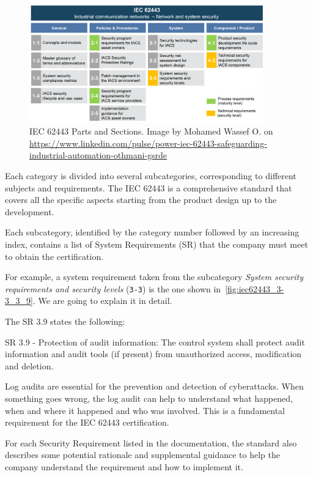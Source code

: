 \begin{figure}[ht]
  \centering
  \includegraphics[width=0.9\textwidth]{chapters/04/assets/iec62443.png}
  \caption[IEC 62443 Parts and Sections. Image by Mohamed Wassef O.]{IEC 62443 Parts and Sections. Image by Mohamed Wassef O. on \url{https://www.linkedin.com/pulse/power-iec-62443-safeguarding-industrial-automation-othmani-gsrde}}
  \label{fig:iec-62443}
\end{figure}

Each category is divided into several subcategories, corresponding to different subjects and requirements. The IEC 62443 is a comprehensive standard that covers all the specific aspects starting from the product design up to the development.

Each subcategory, identified by the category number followed by an increasing index, contains a list of System Requirements (SR) that the company must meet to obtain the certification.

For example, a system requirement taken from the subcategory \textit{System security requirements and security levels} (\texttt{3-3}) is the one shown in~\cref{fig:iec62443_3-3_3_9}. We are going to explain it in detail.

The SR 3.9 states the following:
\begin{mdframed}
  SR 3.9 - Protection of audit information: The control system shall protect audit information and audit tools (if present) from unauthorized access, modification and deletion.
\end{mdframed}\label{sr:3-3_3-9}

Log audits are essential for the prevention and detection of cyberattacks. When something goes wrong, the log audit can help to understand what happened, when and where it happened and who was involved. This is a fundamental requirement for the IEC 62443 certification.

For each Security Requirement listed in the documentation, the standard also describes some potential rationale and supplemental guidance to help the company understand the requirement and how to implement it.

